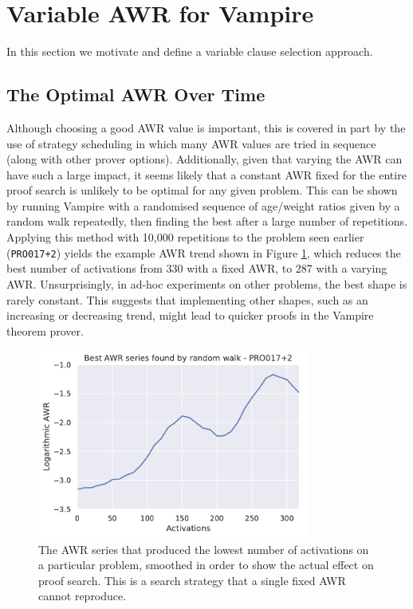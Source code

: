 \documentclass{llncs}
\begin{document}
\section{Variable AWR for Vampire} 

In this section we motivate and define a variable clause selection approach.

\subsection{The Optimal AWR Over Time} \label{sec:varying:study}

Although choosing a good AWR value is important, this is covered in part by the use of strategy scheduling in which many AWR values are tried in sequence (along with other prover options).
Additionally, given that varying the AWR can have such a large impact, it seems likely that a constant AWR fixed for the entire proof search is unlikely to be optimal for any given problem.
This can be shown by running Vampire with a randomised sequence of age/weight ratios given by a random walk repeatedly, then finding the best after a large number of repetitions.
Applying this method with 10,000 repetitions to the problem seen earlier (\texttt{PRO017+2}) yields the example AWR trend shown in Figure \ref{fig:random-walk}, which reduces the best number of activations from 330 with a fixed AWR, to 287 with a varying AWR. 
%
Unsurprisingly, in ad-hoc experiments on other problems, the best shape is rarely constant.
This suggests that implementing other shapes, such as an increasing or decreasing trend, might lead to quicker proofs in the Vampire theorem prover.

\begin{figure}[t]
	\centering
	\includegraphics[width=0.8\textwidth]{random-walk}
	\caption{The AWR series that produced the lowest number of activations on a particular problem, smoothed in order to show the actual effect on proof search. This is a search strategy that a single fixed AWR cannot reproduce.}
	\label{fig:random-walk}
\end{figure}
\end{document}
